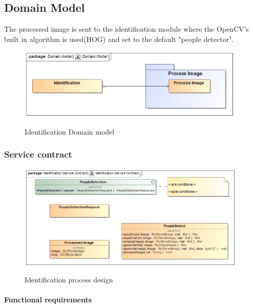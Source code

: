 \documentclass[a4paper,12pt]{report}
\begin{document}
	\FloatBarrier	
	\subsection {Domain Model}
		The processed image is sent to the identification module where the OpenCV's built in algorithm is used(HOG) and set to the default "people detector".
		\begin{figure}[htb]
			\centering
			\includegraphics [scale=0.5]{../Diagrams/Identification_Domain_Model.jpg}
			\caption{Identification Domain model}
		\end{figure}	

		\FloatBarrier	
		\subsubsection {Service contract}
			\begin{figure}[htb]
				\centering
				\includegraphics [scale=0.5]{../Diagrams/Identification_Service_Contract.jpg}
				\caption{Identification process design}
			\end{figure}	

			\FloatBarrier				
			\paragraph {Functional requirements}
			
			\FloatBarrier	
\end{document}
